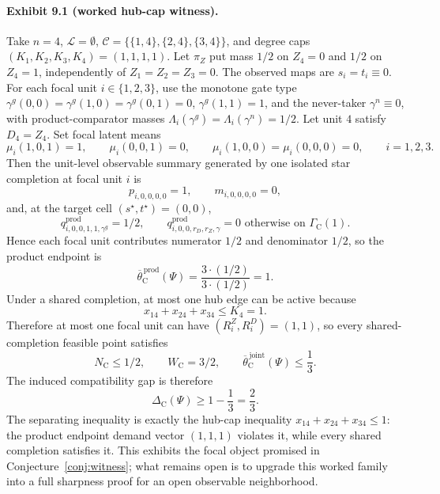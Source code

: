 \documentclass[11pt]{article}
\newcommand{\PsiObs}{\Psi}
\theoremstyle{definition}
\theoremstyle{plain}
\theoremstyle{remark}
\begin{document}
\paragraph{Exhibit 9.1 (worked hub-cap witness).}
Take \(n=4\), \(\mathcal L=\emptyset\),
\(\mathcal C=\{\{1,4\},\{2,4\},\{3,4\}\}\), and degree caps
\((K_1,K_2,K_3,K_4)=(1,1,1,1)\). Let \(\pi_Z\) put mass \(1/2\) on
\(Z_4=0\) and \(1/2\) on \(Z_4=1\), independently of
\(Z_1=Z_2=Z_3=0\). The observed maps are \(s_i=t_i\equiv 0\). For each focal
unit \(i\in\{1,2,3\}\), use the monotone gate type
\(\gamma^{g}(0,0)=\gamma^{g}(1,0)=\gamma^{g}(0,1)=0\),
\(\gamma^{g}(1,1)=1\), and the never-taker \(\gamma^{n}\equiv 0\), with
product-comparator masses
\(\Lambda_i(\gamma^{g})=\Lambda_i(\gamma^{n})=1/2\). Let unit \(4\) satisfy
\(D_4=Z_4\). Set focal latent means
\[
\mu_i(1,0,1)=1,\qquad
\mu_i(0,0,1)=0,\qquad
\mu_i(1,0,0)=\mu_i(0,0,0)=0,
\qquad i=1,2,3.
\]
Then the unit-level observable summary generated by one isolated star
completion at focal unit \(i\) is
\[
p_{i,0,0,0,0}=1,\qquad m_{i,0,0,0,0}=0,
\]
and, at the target cell \((s^\star,t^\star)=(0,0)\),
\[
q_{i,0,0,1,1,\gamma^{g}}^{\mathrm{prod}}=1/2,\qquad
q_{i,0,0,r_D,r_Z,\gamma}^{\mathrm{prod}}=0
\text{ otherwise on }\Gamma_{\mathrm C}(1).
\]
Hence each focal unit contributes numerator \(1/2\) and denominator \(1/2\),
so the product endpoint is
\[
\overline{\theta}^{\,\mathrm{prod}}_{\mathrm C}(\PsiObs)=
\frac{3\cdot (1/2)}{3\cdot (1/2)}=1.
\]
Under a shared completion, at most one hub edge can be active because
\[
x_{14}+x_{24}+x_{34}\le K_4=1.
\]
Therefore at most one focal unit can have
\((R_i^Z,R_i^D)=(1,1)\), so every shared-completion feasible point satisfies
\[
N_{\mathrm C}\le 1/2,\qquad W_{\mathrm C}=3/2,
\qquad
\overline{\theta}^{\,\mathrm{joint}}_{\mathrm C}(\PsiObs)\le \frac{1}{3}.
\]
The induced compatibility gap is therefore
\[
\Delta_{\mathrm C}(\PsiObs)\ge 1-\frac13=\frac23.
\]
The separating inequality is exactly the hub-cap inequality
\(x_{14}+x_{24}+x_{34}\le 1\): the product endpoint demand vector
\((1,1,1)\) violates it, while every shared completion satisfies it. This
exhibits the focal object promised in Conjecture~\ref{conj:witness}; what
remains open is to upgrade this worked family into a full sharpness proof for
an open observable neighborhood.
\end{document}
